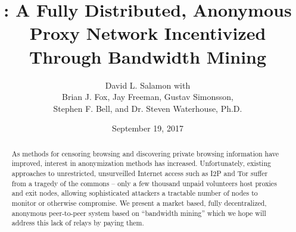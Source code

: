 \documentclass{article}
\title{\mesh{}: A Fully Distributed, Anonymous Proxy Network Incentivized Through Bandwidth Mining}
\author{{David L. Salamon with} \\ {Brian J. Fox, Jay Freeman, Gustav Simonsson,} \\ {{Stephen F. Bell, and Dr. Steven Waterhouse, Ph.D.}}}
\date{September 19, 2017}
\begin{document}
\maketitle

\begin{abstract}

  As methods for censoring browsing and discovering private browsing information have improved, interest in anonymization methods has increased. Unfortunately, existing approaches to unrestricted, unsurveilled Internet access such
as I2P and Tor suffer from a tragedy of the commons – only a few thousand unpaid volunteers host proxies and exit nodes, allowing sophisticated attackers a tractable number of nodes to monitor or otherwise compromise. We present a market based, fully decentralized, anonymous peer-to-peer system based on “bandwidth mining” which we hope will address this lack of relays by paying them.






\end{abstract}
\end{document}
